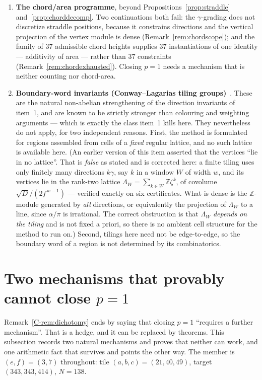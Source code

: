 \documentclass[11pt,reqno]{amsart}
\theoremstyle{plain}
\theoremstyle{definition}
\begin{document}
\begin{enumerate}
\item \textbf{The chord/area programme}, beyond Propositions~\ref{prop:straddle}
and~\ref{prop:chorddecomp}. Two continuations both fail: the $\gamma$-grading does not discretize
straddle positions, because it constrains directions and the vertical projection of the vertex module
is dense (Remark~\ref{rem:chordscope}); and the family of $37$ admissible chord heights supplies $37$
instantiations of one identity --- additivity of area --- rather than $37$ constraints
(Remark~\ref{rem:chordexhausted}). Closing $p=1$ needs a mechanism that is neither counting nor
chord-area.
\item \textbf{Boundary-word invariants (Conway--Lagarias tiling groups)}~\cite{ConwayLagarias}. These
are the natural non-abelian strengthening of the direction invariants of item~1, and are known to be
strictly stronger than colouring and weighting arguments --- which is exactly the class item~1 kills
here. They nevertheless do not apply, for two independent reasons. First, the method is formulated
for regions assembled from cells of a \emph{fixed} regular lattice, and no such lattice is available
here. (An earlier version of this item asserted that the vertices ``lie in no lattice''. That is
\emph{false} as stated and is corrected here: a finite tiling uses only finitely many directions
$k\gamma$, say $k$ in a window $W$ of width $w$, and its vertices lie in the rank-two lattice
$\Lambda_W=\sum_{k\in W}\mathbb Z\zeta^k$, of covolume $\sqrt{D}/(2f^{\,w-1})$ --- verified exactly on
six certificates. What is dense is the $\mathbb Z$-module generated by \emph{all} directions, or
equivalently the projection of $\Lambda_W$ to a line, since $\alpha/\pi$ is irrational. The correct
obstruction is that $\Lambda_W$ \emph{depends on the tiling} and is not fixed a priori, so there is
no ambient cell structure for the method to run on.) Second, tilings here need not be
edge-to-edge, so the boundary word of a region is not determined by its combinatorics.
\end{enumerate}



\section{Two mechanisms that provably cannot close \texorpdfstring{$p=1$}{p=1}}\label{sec:nogo}

Remark~\ref{C-rem:dichotomy} ends by saying that closing $p=1$ ``requires a further mechanism''. That
is a hedge, and it can be replaced by theorems. This subsection records two natural mechanisms and
proves that neither can work, and one arithmetic fact that survives and points the other way. The
member is $(e,f)=(3,7)$ throughout: tile $(a,b,c)=(21,40,49)$, target $(343,343,414)$, $N=138$.
\end{document}

